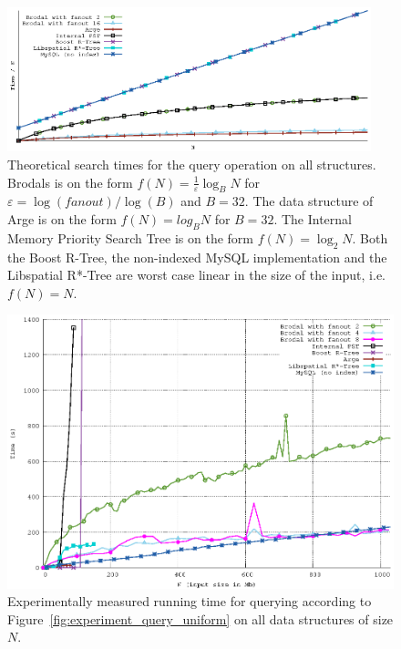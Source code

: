 \documentclass[twoside,11pt,openright]{report}
\def \epsilon {\varepsilon}
\begin{document}
\begin{figure}[h]
\centering
\includegraphics[width=0.94\textwidth]{../plots/query_complexities/query_complexity}
\caption{Theoretical search times for the query operation on all structures. Brodals is on the form $f(N) = \frac{1}{\epsilon}\log_B N$ for $\epsilon = \log(fanout) / \log(B)$ and $B = 32$. The data structure of Arge is on the form $f(N) = log_B N$ for $B = 32$. The Internal Memory Priority Search Tree is on the form $f(N) = \log_2 N$. Both the Boost R-Tree, the non-indexed MySQL implementation and the Libspatial R*-Tree are worst case linear in the size of the input, i.e. $f(N) = N$.}
\label{fig:theory_query_complexity}
\end{figure}

\begin{figure}[h]
\centering
\includegraphics[width=\textwidth]{../src/experiments/query_experiment_results/final2/time}
\caption{Experimentally measured running time for querying according to Figure~\ref{fig:experiment_query_uniform} on all data structures of size $N$.}
\label{fig:result_query_search_complexity}
\end{figure}
\end{document}
